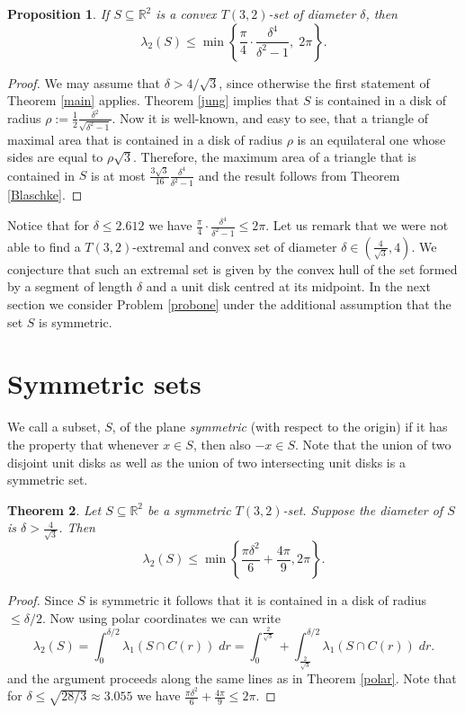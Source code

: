 \documentclass[12pt]{article}
\newtheorem{thm}{Theorem}[section]
\newtheorem{prop}[thm]{Proposition}
\begin{document}
\begin{prop}
If $S\subseteq \mathbb{R}^2$ is a \emph{convex}  $T(3,2)$-set of diameter $\delta$, then 
\[ \lambda_2(S) \leq \min\left\{\frac{\pi}{4}\cdot \frac{\delta^4}{\delta^2 -1}, \; 2\pi \right\} .\]
\end{prop}
\begin{proof} We may assume that $\delta > 4/\sqrt{3}$, since otherwise the first statement of Theorem \ref{main} applies. 
Theorem \ref{jung} implies that $S$ is contained in a disk of radius 
$\rho :=\frac{1}{2}\frac{\delta^2}{\sqrt{\delta^2 -1}}$. Now it is well-known, and easy to see, that a triangle 
of maximal area that is contained in a disk of radius $\rho$ is an equilateral one whose sides are 
equal to $\rho \sqrt{3}$. Therefore, the maximum area of a triangle that is contained in $S$ is at most 
$\frac{3\sqrt{3}}{16}\frac{\delta^4}{\delta^2 -1}$ and the result follows from Theorem \ref{Blaschke}. 
\end{proof}

Notice that for $\delta \leq 2.612$ we have $\frac{\pi}{4}\cdot \frac{\delta^4}{\delta^2 -1}\leq  2\pi$.
Let us remark that we were not able to find a $T(3,2)$-extremal and convex set of 
diameter $\delta\in (\frac{4}{\sqrt{3}}, 4)$. We conjecture that such an extremal set is given 
by the convex hull of the set formed by a segment of length $\delta$ and a unit disk centred 
at its midpoint.  
In the next section we consider Problem \ref{probone} under the additional assumption that 
the set $S$ is symmetric.

\section{Symmetric sets}\label{symmetric}

We call a subset, $S$, of the plane \emph{symmetric} (with respect to the origin) 
if it has the property that whenever $x\in S$, then also $-x\in S$. Note that the union of two 
disjoint unit disks as well as the union of two intersecting unit disks is a symmetric set.


\begin{thm} Let $S\subseteq \mathbb{R}^2$ be a symmetric $T(3,2)$-set.
Suppose the diameter of $S$ is $\delta > \frac{4}{\sqrt{3}}$. Then 
\[ \lambda_2(S) \leq \min\left\{\frac{\pi \delta^2}{6} + \frac{4\pi}{9}, 2\pi \right\} . \]
\end{thm}
\begin{proof} 
Since $S$ is symmetric it follows that it is contained in a disk of radius $\leq \delta/2$. 
Now using polar coordinates we can write
\[ \lambda_2(S) = \int_{0}^{\delta/2} \lambda_1(S\cap C(r))\; dr = \int_{0}^{\frac{2}{\sqrt{3}}} + \int_{\frac{2}{\sqrt{3}}}^{\delta/2}  \lambda_1(S\cap C(r))\; dr . \]
and the argument proceeds along the same lines as in Theorem \ref{polar}.
Note that for $\delta \leq \sqrt{28/3}\approx 3.055$ we have  
$\frac{\pi \delta^2}{6} + \frac{4\pi}{9} \leq 2\pi$. 
\end{proof}
\end{document}
